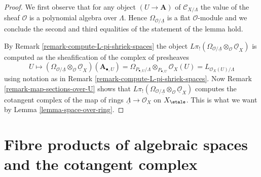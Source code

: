 \begin{proof}
We first observe that for any object $(U \to \mathbf{A})$ of
$\mathcal{C}_{X/\Lambda}$
the value of the sheaf $\mathcal{O}$ is a polynomial algebra over $\Lambda$.
Hence $\Omega_{\mathcal{O}/\underline{\Lambda}}$ is a flat $\mathcal{O}$-module
and we conclude the second and third equalities of the statement of the
lemma hold.

\medskip\noindent
By Remark \ref{remark-compute-L-pi-shriek-spaces} the object
$L\pi_!(\Omega_{\mathcal{O}/\underline{\Lambda}}
\otimes_\mathcal{O} \underline{\mathcal{O}}_X)$
is computed as the sheafification of the complex of presheaves
$$
U \mapsto
\left(\Omega_{\mathcal{O}/\underline{\Lambda}}
\otimes_\mathcal{O} \underline{\mathcal{O}}_X\right)(\mathbf{A}_{\bullet, U})
=
\Omega_{P_{\bullet, U}/\Lambda} \otimes_{P_{\bullet, U}} \mathcal{O}_X(U) =
L_{\mathcal{O}_X(U)/\Lambda}
$$
using notation as in Remark \ref{remark-compute-L-pi-shriek-spaces}.
Now Remark \ref{remark-map-sections-over-U} shows that
$L\pi_!(\Omega_{\mathcal{O}/\underline{\Lambda}}
\otimes_\mathcal{O} \underline{\mathcal{O}}_X)$
computes the cotangent complex of the map of rings
$\underline{\Lambda} \to \mathcal{O}_X$ on $X_\etale$.
This is what we want by Lemma \ref{lemma-space-over-ring}.
\end{proof}






\section{Fibre products of algebraic spaces and the cotangent complex}
\label{section-fibre-product}

